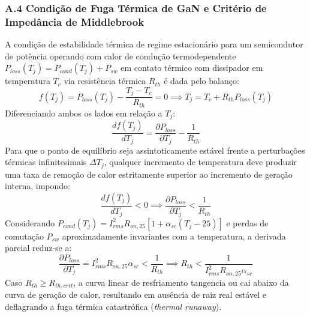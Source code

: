 \subsubsection*{A.4 Condição de Fuga Térmica de GaN e Critério de Impedância de Middlebrook}

A condição de estabilidade térmica de regime estacionário para um semicondutor de potência operando com calor de condução termodependente $P_{loss}(T_j) = P_{cond}(T_j) + P_{sw}$ em contato térmico com dissipador em temperatura $T_c$ via resistência térmica $R_{th}$ é dada pelo balanço:
\begin{equation}
    f(T_j) = P_{loss}(T_j) - \frac{T_j - T_c}{R_{th}} = 0 \implies T_j = T_c + R_{th} P_{loss}(T_j)
\end{equation}
Diferenciando ambos os lados em relação a $T_j$:
\begin{equation}
    \frac{d f(T_j)}{d T_j} = \frac{\partial P_{loss}}{\partial T_j} - \frac{1}{R_{th}}
\end{equation}
Para que o ponto de equilíbrio seja assintoticamente estável frente a perturbações térmicas infinitesimais $\Delta T_j$, qualquer incremento de temperatura deve produzir uma taxa de remoção de calor estritamente superior ao incremento de geração interna, impondo:
\begin{equation}
    \frac{d f(T_j)}{d T_j} < 0 \implies \frac{\partial P_{loss}}{\partial T_j} < \frac{1}{R_{th}}
\end{equation}
Considerando $P_{cond}(T_j) = I_{rms}^2 R_{on,25} [1 + \alpha_{sc}(T_j - 25)]$ e perdas de comutação $P_{sw}$ aproximadamente invariantes com a temperatura, a derivada parcial reduz-se a:
\begin{equation}
    \frac{\partial P_{loss}}{\partial T_j} = I_{rms}^2 R_{on,25} \alpha_{sc} < \frac{1}{R_{th}} \implies R_{th} < \frac{1}{I_{rms}^2 R_{on,25} \alpha_{sc}}
\end{equation}
Caso $R_{th} \ge R_{th,crit}$, a curva linear de resfriamento tangencia ou cai abaixo da curva de geração de calor, resultando em ausência de raiz real estável e deflagrando a fuga térmica catastrófica (\textit{thermal runaway}).

